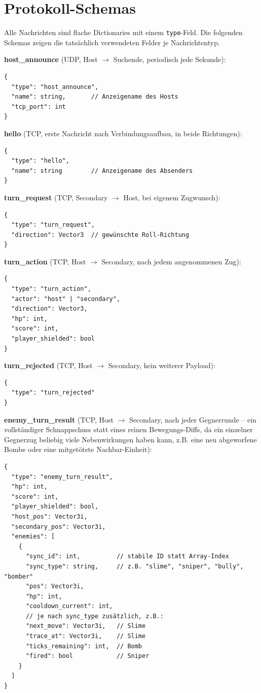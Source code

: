 \documentclass[oneside]{ausarbeitung}
\begin{document}
\section{Protokoll-Schemas}

Alle Nachrichten sind flache Dictionaries mit einem \texttt{type}-Feld. Die folgenden Schemas zeigen
die tatsächlich verwendeten Felder je Nachrichtentyp.


\textbf{host\_announce} (UDP, Host $\rightarrow$ Suchende, periodisch jede Sekunde):
\begin{lstlisting}
{
  "type": "host_announce",
  "name": string,       // Anzeigename des Hosts
  "tcp_port": int
}
\end{lstlisting}

\textbf{hello} (TCP, erste Nachricht nach Verbindungsaufbau, in beide Richtungen):
\begin{lstlisting}
{
  "type": "hello",
  "name": string        // Anzeigename des Absenders
}
\end{lstlisting}

\textbf{turn\_request} (TCP, Secondary $\rightarrow$ Host, bei eigenem Zugwunsch):
\begin{lstlisting}
{
  "type": "turn_request",
  "direction": Vector3  // gewünschte Roll-Richtung
}
\end{lstlisting}

\textbf{turn\_action} (TCP, Host $\rightarrow$ Secondary, nach jedem angenommenen Zug):
\begin{lstlisting}
{
  "type": "turn_action",
  "actor": "host" | "secondary",
  "direction": Vector3,
  "hp": int,
  "score": int,
  "player_shielded": bool
}
\end{lstlisting}

\textbf{turn\_rejected} (TCP, Host $\rightarrow$ Secondary, kein weiterer Payload):
\begin{lstlisting}
{
  "type": "turn_rejected"
}
\end{lstlisting}

\begin{minipage}{\linewidth}
\textbf{enemy\_turn\_result} (TCP, Host $\rightarrow$ Secondary, nach jeder Gegnerrunde -- ein
vollständiger Schnappschuss statt eines reinen Bewegungs-Diffs, da ein einzelner Gegnerzug beliebig
viele Nebenwirkungen haben kann, z.B. eine neu abgeworfene Bombe oder eine mitgetötete Nachbar-Einheit):
\begin{lstlisting}
{
  "type": "enemy_turn_result",
  "hp": int,
  "score": int,
  "player_shielded": bool,
  "host_pos": Vector3i,
  "secondary_pos": Vector3i,
  "enemies": [
    {
      "sync_id": int,          // stabile ID statt Array-Index
      "sync_type": string,     // z.B. "slime", "sniper", "bully", "bomber"
      "pos": Vector3i,
      "hp": int,
      "cooldown_current": int,
      // je nach sync_type zusätzlich, z.B.:
      "next_move": Vector3i,   // Slime
      "trace_at": Vector3i,    // Slime
      "ticks_remaining": int,  // Bomb
      "fired": bool            // Sniper
    }
  ]
}
\end{lstlisting}
\end{minipage}
\end{document}
